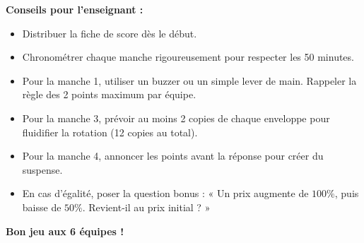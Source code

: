 \documentclass[12pt,a4paper]{article}
\begin{document}
\vspace{0.5cm}

\begin{regle}
\textbf{Conseils pour l'enseignant :}
\begin{itemize}
    \item Distribuer la fiche de score dès le début.
    \item Chronométrer chaque manche rigoureusement pour respecter les 50 minutes.
    \item Pour la manche 1, utiliser un buzzer ou un simple lever de main. Rappeler la règle des 2 points maximum par équipe.
    \item Pour la manche 3, prévoir au moins 2 copies de chaque enveloppe pour fluidifier la rotation (12 copies au total).
    \item Pour la manche 4, annoncer les points avant la réponse pour créer du suspense.
    \item En cas d'égalité, poser la question bonus : « Un prix augmente de \(100\%\), puis baisse de \(50\%\). Revient-il au prix initial ? »
\end{itemize}
\end{regle}

\vspace{0.5cm}

\begin{center}
{\Large\bfseries\color{bleufonce} Bon jeu aux 6 équipes !}
\end{center}
\end{document}
